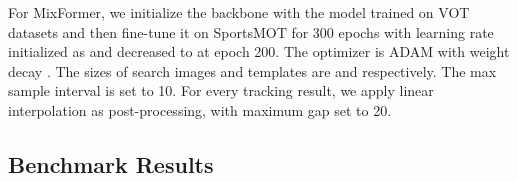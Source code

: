 \documentclass[10pt,twocolumn,letterpaper]{article}
\begin{document}
{For MixFormer, we initialize the backbone with the model trained on VOT datasets and then fine-tune it on SportsMOT for 300 epochs with learning rate initialized as  and decreased to  at epoch 200. The optimizer is ADAM\cite{kingma2014adam} with weight decay . The sizes of search images and templates are  and  respectively. The max sample interval is set to 10.
For every tracking result, we apply linear interpolation as post-processing, with maximum gap set to 20.

\subsection{Benchmark Results}

\begin{table*}[!t]
\begin{center}{
}
\end{center}
\end{table*}}
\end{document}
